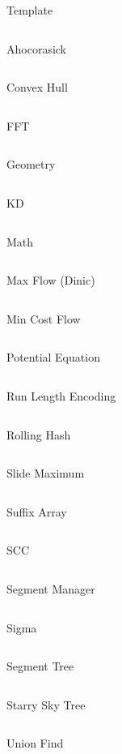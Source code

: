 \documentclass[10pt,a4paper]{jsarticle}
\newcommand{\library}[2]{
    {\large #2}
    \vspace{-10pt}
    \inputminted{c++}{#1}
}
\begin{document}
\library{/Users/drafear/mylib/bin/src/kp_header.cpp}{Template}
\library{../lib/ahocorasick.cpp}{Ahocorasick}
\library{../lib/convex_hull_trick.cpp}{Convex Hull}
\library{../lib/fft.cpp}{FFT}
\library{../lib/geometry_comment.cpp}{Geometry}
\library{../lib/kd.cpp}{KD}
\library{../lib/math.cpp}{Math}
\library{../lib/max_flow.cpp}{Max Flow (Dinic)}
\library{../lib/min_cost_flow.cpp}{Min Cost Flow}
\library{../lib/potential_eq.cpp}{Potential Equation}
\library{../lib/rle.cpp}{Run Length Encoding}
\library{../lib/rollinghash.cpp}{Rolling Hash}
\library{../lib/maxset.cpp}{Slide Maximum}
\library{../lib/sa.cpp}{Suffix Array}
\library{../lib/scc.cpp}{SCC}
\library{../lib/segment_manager.cpp}{Segment Manager}
\library{../lib/sigma.cpp}{Sigma}
\library{../lib/segtree2.cpp}{Segment Tree}
\library{../lib/sst.cpp}{Starry Sky Tree}
\library{../lib/unionfind.cpp}{Union Find}
\end{document}
